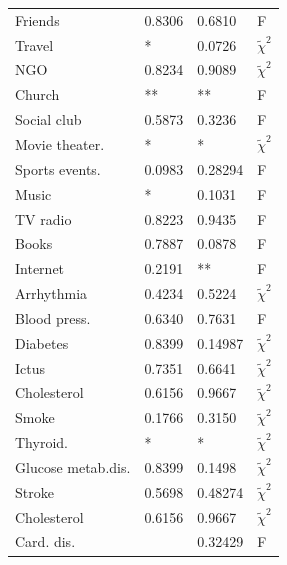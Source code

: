 \documentclass[11pt]{article}
\theoremstyle{definition}
\theoremstyle{remark}
\begin{document}
\begin{table}[!htb]
\begin{tabular}{ |p{3cm}||p{3cm}|p{3cm}|p{.7cm}|  }
 Friends & 0.8306 & 0.6810 & F\\
 Travel & * & 0.0726 & $\tilde{\chi}^2$\\
 NGO  & 0.8234 & 0.9089 & $\tilde{\chi}^2$\\
 Church  & ** & ** & F\\
 Social club & 0.5873 & 0.3236 & F\\
 Movie theater.& * & * & $\tilde{\chi}^2$\\
 Sports events. & 0.0983 & 0.28294 & F\\
 Music & * & 0.1031 & F\\
 TV radio & 0.8223 & 0.9435 & F\\ 
 Books & 0.7887 & 0.0878 & F\\ 
 Internet & 0.2191 & ** & F\\ 
 Arrhythmia & 0.4234 & 0.5224 & $\tilde{\chi}^2$\\
 Blood press.& 0.6340 & 0.7631 & F \\
 Diabetes & 0.8399 &  0.14987 & $\tilde{\chi}^2$\\
 Ictus & 0.7351 & 0.6641 & $\tilde{\chi}^2$\\
 Cholesterol & 0.6156 & 0.9667 & $\tilde{\chi}^2$\\ %
 Smoke & 0.1766  & 0.3150 & $\tilde{\chi}^2$\\
 Thyroid. & * & * & $\tilde{\chi}^2$\\
 Glucose metab.dis.&0.8399 & 0.1498 & $\tilde{\chi}^2$\\ 
 Stroke &0.5698 & 0.48274 & $\tilde{\chi}^2$\\  %
 Cholesterol & 0.6156 & 0.9667 & $\tilde{\chi}^2$\\
 Card. dis. & &0.32429&F\\
 \hline
\end{tabular}
\label{tab:fischiall}
\end{table}
\end{document}
